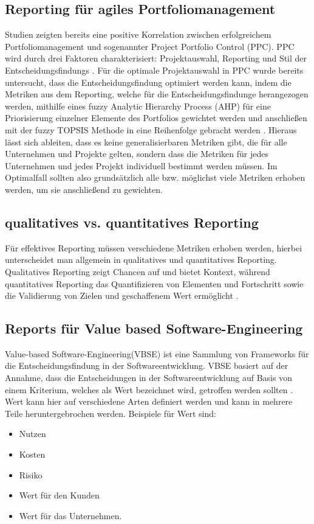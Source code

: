 \subsection{Reporting für agiles Portfoliomanagement}
Studien zeigten bereits eine positive Korrelation zwischen erfolgreichem Portfoliomanagement und sogenannter Project Portfolio Control (PPC). PPC wird durch drei Faktoren charakterisiert: Projektauswahl, Reporting und Stil der Entscheidungsfindungs \cite{ProjectPortfolioControl}.
Für die optimale Projektauswahl in PPC wurde bereits untersucht, dass die Entscheidungsfindung optimiert werden kann, indem die Metriken aus dem Reporting, welche für die Entscheidungsfindunge herangezogen werden, mithilfe eines fuzzy Analytic Hierarchy Process (AHP) für eine Priorisierung einzelner Elemente des Portfolios gewichtet werden und anschließen mit der fuzzy TOPSIS Methode in eine Reihenfolge gebracht werden \cite{Mohammed2021}.
Hieraus lässt sich ableiten, dass es keine generalisierbaren Metriken gibt, die für alle Unternehmen und Projekte gelten, sondern dass die Metriken für jedes Unternehmen und jedes Projekt individuell bestimmt werden müssen. Im Optimalfall sollten also grundsätzlich alle bzw. möglichst viele  Metriken erhoben werden, um sie anschließend zu gewichten.

\subsection{qualitatives vs. quantitatives Reporting}
Für effektives Reporting müssen verschiedene Metriken erhoben werden, hierbei unterscheidet man allgemein in qualitatives und quantitatives Reporting.
Qualitatives Reporting zeigt Chancen auf und bietet Kontext, während quantitatives Reporting das Quantifizieren von Elementen und Fortschritt sowie die Validierung von Zielen und geschaffenem Wert ermöglicht \cite{}.

\subsection{Reports für Value based Software-Engineering}
Value-based Software-Engineering(VBSE) ist eine Sammlung von Frameworks für die Entscheidungsfindung in der Softwareentwicklung. VBSE basiert auf der Annahme, dass die Entscheidungen in der Softwareentwicklung auf Basis von einem Kriterium, welches als Wert bezeichnet wird, getroffen werden sollten \cite{}.
Wert kann hier auf verschiedene Arten definiert werden und kann in mehrere Teile heruntergebrochen werden. Beispiele für Wert sind:
\begin{itemize}
  \item Nutzen
  \item Kosten
  \item Risiko
  \item Wert für den Kunden
  \item Wert für das Unternehmen.
\end{itemize}

